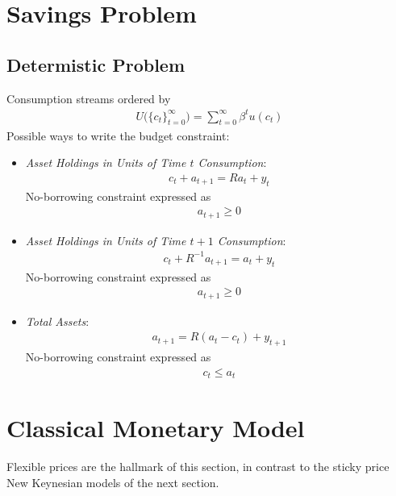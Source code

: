 \documentclass[12pt]{article}
\theoremstyle{plain}
\theoremstyle{definition}
\theoremstyle{remark}
\newcommand{\sumtinfz}{\sum^\infty_{t=0}}
\newcommand{\tinfz}{^\infty_{t=0}}
\begin{document}
\clearpage
\section{Savings Problem}

\subsection{Determistic Problem}

Consumption streams ordered by
\begin{align*}
  U\big(\{c_t\}\tinfz\big)
  = \sumtinfz \beta^tu(c_t)
\end{align*}
Possible ways to write the budget constraint:
\begin{itemize}
  \item
    \emph{Asset Holdings in Units of Time $t$ Consumption}:
    \begin{align*}
      c_t + a_{t+1} = Ra_t + y_t
    \end{align*}
    No-borrowing constraint expressed as
    \begin{align*}
      a_{t+1} \geq 0
    \end{align*}

  \item
    \emph{Asset Holdings in Units of Time $t+1$ Consumption}:
    \begin{align*}
      c_t + R^{-1}a_{t+1} = a_t + y_t
    \end{align*}
    No-borrowing constraint expressed as
    \begin{align*}
      a_{t+1} \geq 0
    \end{align*}

  \item \emph{Total Assets}:
    \begin{align*}
      a_{t+1} = R(a_t-c_t) + y_{t+1}
    \end{align*}
    No-borrowing constraint expressed as
    \begin{align*}
      c_t \leq a_t
    \end{align*}


\end{itemize}

\clearpage
\section{Classical Monetary Model}

Flexible prices are the hallmark of this section, in contrast to the
sticky price New Keynesian models of the next section.
\end{document}
